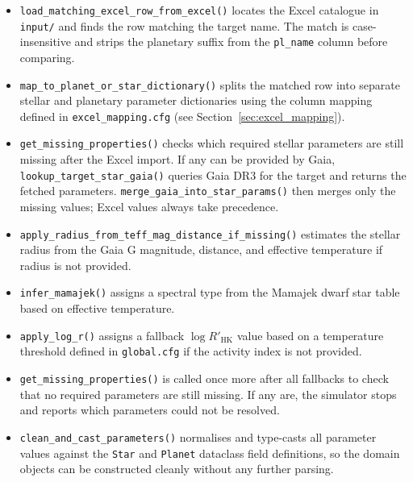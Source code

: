 \begin{itemize}

    \item \texttt{load\_matching\_excel\_row\_from\_excel()} locates the Excel catalogue in \texttt{input/} and finds the row matching the target name. The match is case-insensitive and strips the planetary suffix from the \texttt{pl\_name} column before comparing.

    \item \texttt{map\_to\_planet\_or\_star\_dictionary()} splits the matched row into separate stellar and planetary parameter dictionaries using the column mapping defined in \texttt{excel\_mapping.cfg} (see Section~\ref{sec:excel_mapping}).

    \item \texttt{get\_missing\_properties()} checks which required stellar parameters are still missing after the Excel import. If any can be provided by Gaia, \texttt{lookup\_target\_star\_gaia()} queries Gaia DR3 for the target and returns the fetched parameters. \texttt{merge\_gaia\_into\_star\_params()} then merges only the missing values; Excel values always take precedence.

    \item \texttt{apply\_radius\_from\_teff\_mag\_distance\_if\_missing()} estimates the stellar radius from the Gaia G magnitude, distance, and effective temperature if radius is not provided.

    \item \texttt{infer\_mamajek()} assigns a spectral type from the Mamajek dwarf star table based on effective temperature.

    \item \texttt{apply\_log\_r()} assigns a fallback $\log R'_{\mathrm{HK}}$ value based on a temperature threshold defined in \texttt{global.cfg} if the activity index is not provided.

    \item \texttt{get\_missing\_properties()} is called once more after all fallbacks to check that no required parameters are still missing. If any are, the simulator stops and reports which parameters could not be resolved.

    \item \texttt{clean\_and\_cast\_parameters()} normalises and type-casts all parameter values against the \texttt{Star} and \texttt{Planet} dataclass field definitions, so the domain objects can be constructed cleanly without any further parsing.

\end{itemize}

